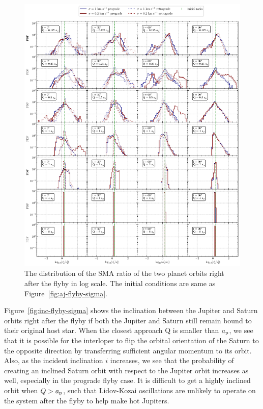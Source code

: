 \documentclass[twocolumn]{aastex63}
\newcommand*\fgr[1]{Figure~\ref{#1}}
\begin{document}
\begin{figure}
    \includegraphics[width=\textwidth]{figs/ratio-flyby-sigma.pdf}
    \caption{The distribution of the SMA ratio of the two planet orbits right after the flyby in log scale.  The initial conditions are same as \fgr{fig:aj-flyby-sigma}.} 
    \label{fig:ratio-flyby-sigma}
\end{figure}
\fgr{fig:inc-flyby-sigma} shows the inclination between the Jupiter and Saturn orbits right after the flyby if both the Jupiter and Saturn still remain bound to their original host star. When the closest approach Q is smaller than $a_{\rm p}$, we see that it is possible for the interloper to flip the orbital orientation of the Saturn to the opposite direction by transferring sufficient angular momentum to its orbit. Also, as the incident inclination $i$ increases, we see that the probability of creating an inclined Saturn orbit with respect to the Jupiter orbit increases as well, especially in the prograde flyby case.
It is difficult to get a highly inclined orbit when $Q>a_{\rm p}$, such that Lidov-Kozai oscillations are unlikely to operate on the system after the flyby to help make hot Jupiters. 
\end{document}
